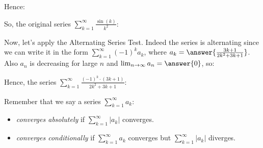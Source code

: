 \documentclass{ximera}
\begin{document}
\begin{exercise}
\begin{exercise}
Hence:

\begin{multipleChoice}
\end{multipleChoice}

So, the original series $\sum_{k=1}^{\infty} \frac{\sin(k)}{k^2}$:
\begin{multipleChoice}
\end{multipleChoice}

\begin{exercise}
Now, let's apply the Alternating Series Test.  Indeed the series is alternating since we can write it in the form $\sum_{k=1}^{\infty} (-1)^k a_k$, where $a_k = \answer{\frac{3k+1}{2k^2+3k+1}}$. Also $a_n$ is decreasing for large $n$ and $\lim_{n \to \infty} a_n = \answer{0}$, so:

\begin{multipleChoice}
\end{multipleChoice}

Hence, the series $\sum_{k=1}^{\infty} \frac{(-1)^k \cdot(3k+1)}{2k^2+3k+1}$:

\begin{multipleChoice}
\end{multipleChoice}

\begin{hint}
Remember that we say a series $\sum_{k=1}^{\infty} a_k$:

\begin{itemize}
\item \emph{converges absolutely} if $\sum_{k=1}^{\infty} |a_k|$ converges.
\item  \emph{converges conditionally} if $\sum_{k=1}^{\infty} a_k$ converges but $\sum_{k=1}^{\infty} |a_k|$ diverges.
\end{itemize}

\end{hint}

\end{exercise}

\end{exercise}
\end{exercise}
\end{document}
